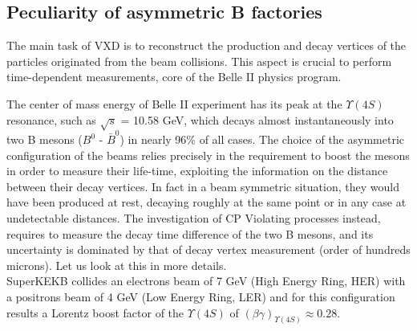 
\subsection{Peculiarity of asymmetric B factories} \label{vertex_decay}

The main task of VXD is to reconstruct the production and decay vertices of the particles originated from the beam collisions. This aspect is crucial to perform time-dependent measurements, core of the Belle II physics program.%

The center of mass energy of Belle II experiment has its peak at the $\Upsilon(4S)$ resonance, such as $\sqrt{s}$ = 10.58 GeV, which decays almost instantaneously into two B mesons ($B^{0}$ - $\bar{B}^{0}$) in nearly 96\% of all cases. The choice of the asymmetric configuration of the beams relies precisely in the requirement to boost the mesons in order to measure their life-time, exploiting the information on the distance between their decay vertices. In fact in a beam symmetric situation, they would have been produced at rest, decaying roughly at the same point or in any case at undetectable distances. The investigation of CP Violating processes instead, requires to measure the decay time difference of the two B mesons, and its uncertainty is dominated by that of decay vertex measurement (order of hundreds microns). Let us look at this in more details.\\

SuperKEKB collides an electrons beam of 7 GeV (High Energy Ring, HER) with a positrons beam of 4 GeV (Low Energy Ring, LER) and for this configuration results a Lorentz boost factor of the $\Upsilon(4S)$ of $(\beta\gamma)_{\Upsilon(4S)} \approx 0.28 $.


\begin{comment}
Indeed it must be valid:

\begin{align}
s = (p_{{e}^{-}}^{\mu} + p_{{e}^{+}}^{\mu}&)^{2}  = m^{2}_{\Upsilon(4S)}, \qquad with\  m_{e^{+/-}} \ll E_{{e}^{+/-}} \\ 
\centering
& \Rightarrow \quad 4E_{{e}^{-}}E_{{e}^{+}} = m^{2}_{\Upsilon(4S)}
\end{align}

So it's possible to compute the Lorentz boost of the mass center:

\begin{align}
\vec{P}_{\Upsilon(4S)} &= \vec{p}_{{e}^{-}} + \vec{p}_{{e}^{+}} = (\beta\gamma)_{\Upsilon(4S)}m_{\Upsilon(4S)} \approx 3 \ GeV \\  & \Rightarrow \  (\beta\gamma)_{\Upsilon(4S)} = \frac{3 \ GeV}{10.58 GeV} \approx 0.28
\end{align}

\end{comment}

